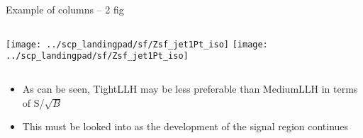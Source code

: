 \documentclass{beamer}
\begin{document}
		
\begin{frame}{Example of columns -- 2 fig}

	\begin{block}{}  %
		\begin{columns}[c]
			\column{0.5\paperwidth}
				\centering
				\texttt{[image: ../scp\_landingpad/sf/Zsf\_jet1Pt\_iso]}
			\column{0.5\paperwidth}
				\centering
				\texttt{[image: ../scp\_landingpad/sf/Zsf\_jet1Pt\_iso]}
		\end{columns}


	\end{block}
	\begin{block}{} %
		\begin{itemize}
			\item As can be seen, TightLLH may be less preferable than MediumLLH in terms of S/$\sqrt{B}$
			\item This must be looked into as the development of the signal region continues
		\end{itemize}
	\end{block}
		\end{frame}
		
		
		
\end{document}
